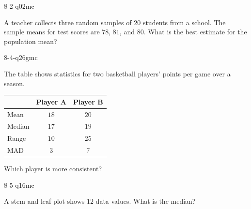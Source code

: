 \begin{practiceQuestion}{8-2-q02}{mc}
\begin{questionText}
A teacher collects three random samples of $20$ students from a school. The sample means for test scores are $78$, $81$, and $80$. What is the best estimate for the population mean?
\end{questionText}
\end{practiceQuestion}

\begin{practiceQuestion}{8-4-q26}{gmc}
\begin{questionText}
The table shows statistics for two basketball players' points per game over a season.

\begin{center}
\begin{tabular}{|l|c|c|}
\hline
 & \textbf{Player A} & \textbf{Player B} \\
\hline
Mean & $18$ & $20$ \\
\hline
Median & $17$ & $19$ \\
\hline
Range & $10$ & $25$ \\
\hline
MAD & $3$ & $7$ \\
\hline
\end{tabular}
\end{center}

Which player is more consistent?
\end{questionText}
\end{practiceQuestion}

\begin{practiceQuestion}{8-5-q16}{mc}
\begin{questionText}
A stem-and-leaf plot shows $12$ data values. What is the median?
\end{questionText}
\end{practiceQuestion}

